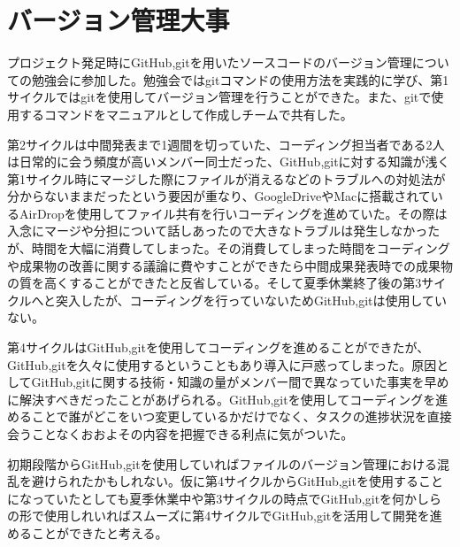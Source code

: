 \section{バージョン管理大事}
プロジェクト発足時にGitHub,gitを用いたソースコードのバージョン管理についての勉強会に参加した。勉強会ではgitコマンドの使用方法を実践的に学び、第1サイクルではgitを使用してバージョン管理を行うことができた。また、gitで使用するコマンドをマニュアルとして作成しチームで共有した。
\par 第2サイクルは中間発表まで1週間を切っていた、コーディング担当者である2人は日常的に会う頻度が高いメンバー同士だった、GitHub,gitに対する知識が浅く第1サイクル時にマージした際にファイルが消えるなどのトラブルへの対処法が分からないままだったという要因が重なり、GoogleDriveやMacに搭載されているAirDropを使用してファイル共有を行いコーディングを進めていた。その際は入念にマージや分担について話しあったので大きなトラブルは発生しなかったが、時間を大幅に消費してしまった。その消費してしまった時間をコーディングや成果物の改善に関する議論に費やすことができたら中間成果発表時での成果物の質を高くすることができたと反省している。そして夏季休業終了後の第3サイクルへと突入したが、コーディングを行っていないためGitHub,gitは使用していない。
\par 第4サイクルはGitHub,gitを使用してコーディングを進めることができたが、GitHub,gitを久々に使用するということもあり導入に戸惑ってしまった。原因としてGitHub,gitに関する技術・知識の量がメンバー間で異なっていた事実を早めに解決すべきだったことがあげられる。GitHub,gitを使用してコーディングを進めることで誰がどこをいつ変更しているかだけでなく、タスクの進捗状況を直接会うことなくおおよその内容を把握できる利点に気がついた。
\par  初期段階からGitHub,gitを使用していればファイルのバージョン管理における混乱を避けられたかもしれない。仮に第4サイクルからGitHub,gitを使用することになっていたとしても夏季休業中や第3サイクルの時点でGitHub,gitを何かしらの形で使用しれいればスムーズに第4サイクルでGitHub,gitを活用して開発を進めることができたと考える。
